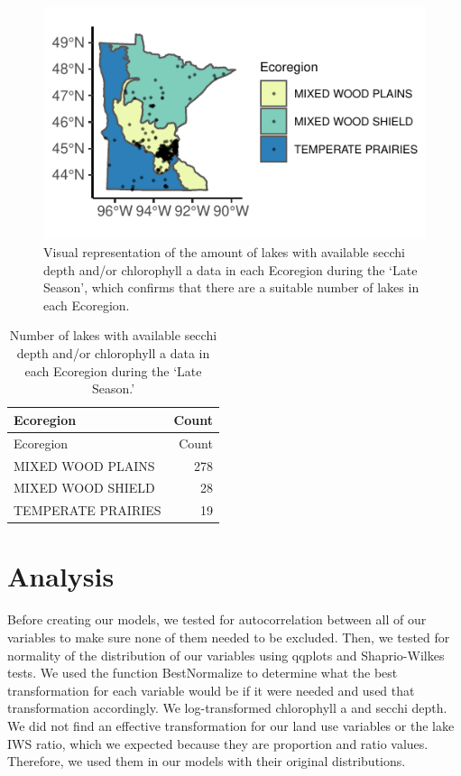 \documentclass[12pt,]{article}
\begin{document}
\begin{figure}
\centering
\includegraphics{Bollt_Greif_Raby_Roth_Project_Final_files/figure-latex/unnamed-chunk-14-1.pdf}
\caption{Visual representation of the amount of lakes with available
secchi depth and/or chlorophyll a data in each Ecoregion during the
`Late Season', which confirms that there are a suitable number of lakes
in each Ecoregion.}
\end{figure}

\begin{longtable}[]{@{}lr@{}}
\caption{Number of lakes with available secchi depth and/or chlorophyll
a data in each Ecoregion during the `Late Season.'}\tabularnewline
\toprule
Ecoregion & Count\tabularnewline
\midrule
\endfirsthead
\toprule
Ecoregion & Count\tabularnewline
\midrule
\endhead
MIXED WOOD PLAINS & 278\tabularnewline
MIXED WOOD SHIELD & 28\tabularnewline
TEMPERATE PRAIRIES & 19\tabularnewline
\bottomrule
\end{longtable}

\newpage

\hypertarget{analysis}{%
\section{Analysis}\label{analysis}}

Before creating our models, we tested for autocorrelation between all of
our variables to make sure none of them needed to be excluded. Then, we
tested for normality of the distribution of our variables using qqplots
and Shaprio-Wilkes tests. We used the function BestNormalize to
determine what the best transformation for each variable would be if it
were needed and used that transformation accordingly. We log-transformed
chlorophyll a and secchi depth. We did not find an effective
transformation for our land use variables or the lake IWS ratio, which
we expected because they are proportion and ratio values. Therefore, we
used them in our models with their original distributions.
\end{document}
